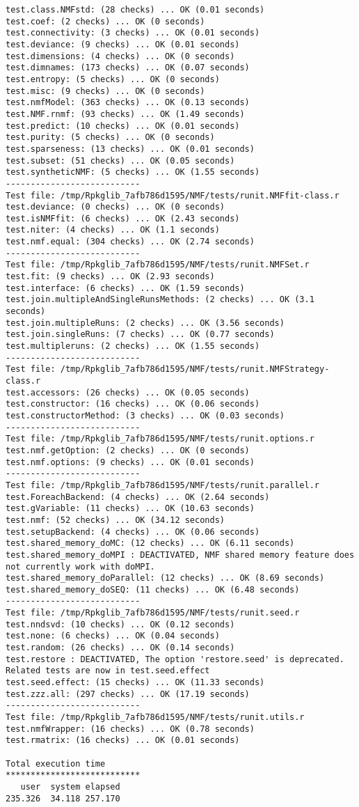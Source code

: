 \documentclass[10pt]{article}
\begin{document}
\begin{verbatim}
test.class.NMFstd: (28 checks) ... OK (0.01 seconds)
test.coef: (2 checks) ... OK (0 seconds)
test.connectivity: (3 checks) ... OK (0.01 seconds)
test.deviance: (9 checks) ... OK (0.01 seconds)
test.dimensions: (4 checks) ... OK (0 seconds)
test.dimnames: (173 checks) ... OK (0.07 seconds)
test.entropy: (5 checks) ... OK (0 seconds)
test.misc: (9 checks) ... OK (0 seconds)
test.nmfModel: (363 checks) ... OK (0.13 seconds)
test.NMF.rnmf: (93 checks) ... OK (1.49 seconds)
test.predict: (10 checks) ... OK (0.01 seconds)
test.purity: (5 checks) ... OK (0 seconds)
test.sparseness: (13 checks) ... OK (0.01 seconds)
test.subset: (51 checks) ... OK (0.05 seconds)
test.syntheticNMF: (5 checks) ... OK (1.55 seconds)
--------------------------- 
Test file: /tmp/Rpkglib_7afb786d1595/NMF/tests/runit.NMFfit-class.r 
test.deviance: (0 checks) ... OK (0 seconds)
test.isNMFfit: (6 checks) ... OK (2.43 seconds)
test.niter: (4 checks) ... OK (1.1 seconds)
test.nmf.equal: (304 checks) ... OK (2.74 seconds)
--------------------------- 
Test file: /tmp/Rpkglib_7afb786d1595/NMF/tests/runit.NMFSet.r 
test.fit: (9 checks) ... OK (2.93 seconds)
test.interface: (6 checks) ... OK (1.59 seconds)
test.join.multipleAndSingleRunsMethods: (2 checks) ... OK (3.1 seconds)
test.join.multipleRuns: (2 checks) ... OK (3.56 seconds)
test.join.singleRuns: (7 checks) ... OK (0.77 seconds)
test.multipleruns: (2 checks) ... OK (1.55 seconds)
--------------------------- 
Test file: /tmp/Rpkglib_7afb786d1595/NMF/tests/runit.NMFStrategy-class.r 
test.accessors: (26 checks) ... OK (0.05 seconds)
test.constructor: (16 checks) ... OK (0.06 seconds)
test.constructorMethod: (3 checks) ... OK (0.03 seconds)
--------------------------- 
Test file: /tmp/Rpkglib_7afb786d1595/NMF/tests/runit.options.r 
test.nmf.getOption: (2 checks) ... OK (0 seconds)
test.nmf.options: (9 checks) ... OK (0.01 seconds)
--------------------------- 
Test file: /tmp/Rpkglib_7afb786d1595/NMF/tests/runit.parallel.r 
test.ForeachBackend: (4 checks) ... OK (2.64 seconds)
test.gVariable: (11 checks) ... OK (10.63 seconds)
test.nmf: (52 checks) ... OK (34.12 seconds)
test.setupBackend: (4 checks) ... OK (0.06 seconds)
test.shared_memory_doMC: (12 checks) ... OK (6.11 seconds)
test.shared_memory_doMPI : DEACTIVATED, NMF shared memory feature does not currently work with doMPI.
test.shared_memory_doParallel: (12 checks) ... OK (8.69 seconds)
test.shared_memory_doSEQ: (11 checks) ... OK (6.48 seconds)
--------------------------- 
Test file: /tmp/Rpkglib_7afb786d1595/NMF/tests/runit.seed.r 
test.nndsvd: (10 checks) ... OK (0.12 seconds)
test.none: (6 checks) ... OK (0.04 seconds)
test.random: (26 checks) ... OK (0.14 seconds)
test.restore : DEACTIVATED, The option 'restore.seed' is deprecated. Related tests are now in test.seed.effect
test.seed.effect: (15 checks) ... OK (11.33 seconds)
test.zzz.all: (297 checks) ... OK (17.19 seconds)
--------------------------- 
Test file: /tmp/Rpkglib_7afb786d1595/NMF/tests/runit.utils.r 
test.nmfWrapper: (16 checks) ... OK (0.78 seconds)
test.rmatrix: (16 checks) ... OK (0.01 seconds)

Total execution time
***************************
   user  system elapsed 
235.326  34.118 257.170 

\end{verbatim}
\end{document}
